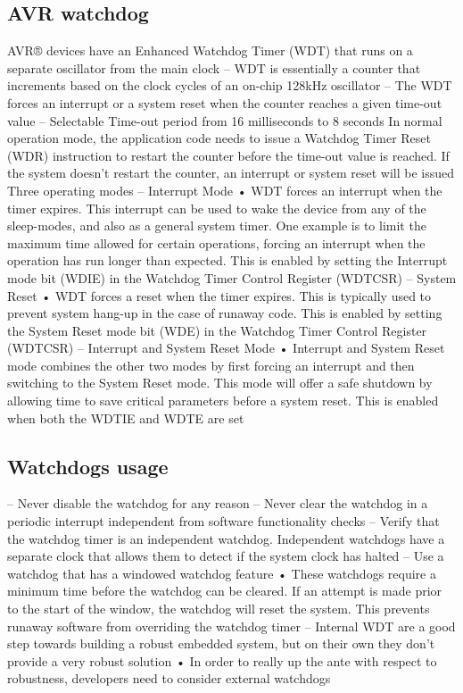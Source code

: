 \subsection{AVR watchdog}
AVR® devices have an Enhanced Watchdog Timer (WDT)
that runs on a separate oscillator from the main clock
– WDT is essentially a counter that increments based on the clock
cycles of an on-chip 128kHz oscillator
– The WDT forces an interrupt or a system reset when the counter
reaches a given time-out value
– Selectable Time-out period from 16 milliseconds to 8 seconds
In normal operation mode, the
application code needs to issue
a Watchdog Timer Reset
(WDR) instruction to restart the
counter before the time-out
value is reached. If the system
doesn't restart the counter, an
interrupt or system reset will be
issued
Three operating modes
– Interrupt Mode
• WDT forces an interrupt when the timer expires. This interrupt can be
used to wake the device from any of the sleep-modes, and also as a
general system timer. One example is to limit the maximum time
allowed for certain operations, forcing an interrupt when the operation
has run longer than expected. This is enabled by setting the Interrupt
mode bit (WDIE) in the Watchdog Timer Control Register (WDTCSR)
– System Reset
• WDT forces a reset when the timer expires. This is typically used to
prevent system hang-up in the case of runaway code. This is enabled
by setting the System Reset mode bit (WDE) in the Watchdog Timer
Control Register (WDTCSR)
– Interrupt and System Reset Mode
• Interrupt and System Reset mode combines the other two modes by
first forcing an interrupt and then switching to the System Reset mode.
This mode will offer a safe shutdown by allowing time to save critical
parameters before a system reset. This is enabled when both the
WDTIE and WDTE are set

\subsection{Watchdogs usage}
– Never disable the watchdog for any reason
– Never clear the watchdog in a periodic interrupt independent from
software functionality checks
– Verify that the watchdog timer is an independent watchdog.
Independent watchdogs have a separate clock that allows them to
detect if the system clock has halted
– Use a watchdog that has a windowed watchdog feature
• These watchdogs require a minimum time before the watchdog can be
cleared. If an attempt is made prior to the start of the window, the
watchdog will reset the system. This prevents runaway software from
overriding the watchdog timer
– Internal WDT are a good step towards building a robust embedded
system, but on their own they don’t provide a very robust solution
• In order to really up the ante with respect to robustness, developers
need to consider external watchdogs


